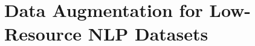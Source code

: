 
















\section{Data Augmentation for Low-Resource NLP Datasets}
\label{sec:2-low_resource_mt}

